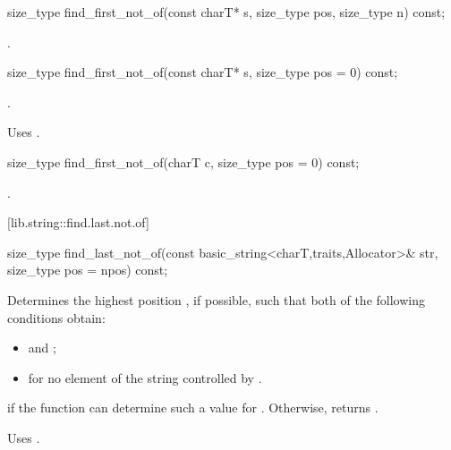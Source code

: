 %
%
\begin{itemdecl}
size_type
  find_first_not_of(const charT* s, size_type pos, size_type n) const;
\end{itemdecl}

\begin{itemdescr}
\pnum
\returns
{}.
\end{itemdescr}

%
%
\begin{itemdecl}
size_type find_first_not_of(const charT* s, size_type pos = 0) const;
\end{itemdecl}

\begin{itemdescr}
\pnum
\returns
{}.

\pnum
\notes
Uses .
\end{itemdescr}

%
%
\begin{itemdecl}
size_type find_first_not_of(charT c, size_type pos = 0) const;
\end{itemdecl}

\begin{itemdescr}
\pnum
\returns
{}.
\end{itemdescr}

[lib.string::find.last.not.of]{}

%
%
\begin{itemdecl}
size_type
  find_last_not_of(const basic_string<charT,traits,Allocator>& str,
                   size_type pos = npos) const;
\end{itemdecl}

\begin{itemdescr}
\pnum
\effects
Determines the highest position , if possible, such that both of
the following conditions obtain:

\begin{itemize}
\item
{}
and
;
\item
{}%
for no element  of the string
controlled by .
\end{itemize}

\pnum
\returns
{} if the function can determine such a value for .
Otherwise, returns
.

\pnum
\notes
Uses
.
\end{itemdescr}


